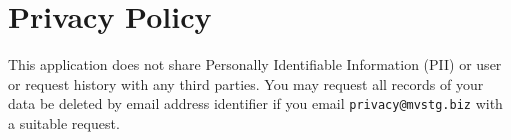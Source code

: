 \documentclass[11pt]{article}
\author{Cyber}
\date{\today}
\title{}
\begin{document}
\tableofcontents

\section{Privacy Policy}
\label{sec:orga45b227}
This application does not share Personally Identifiable Information (PII) or user or request history with any third parties.
You may request all records of your data be deleted by email address identifier if you email \texttt{privacy@mvstg.biz} with a suitable request.
\end{document}
